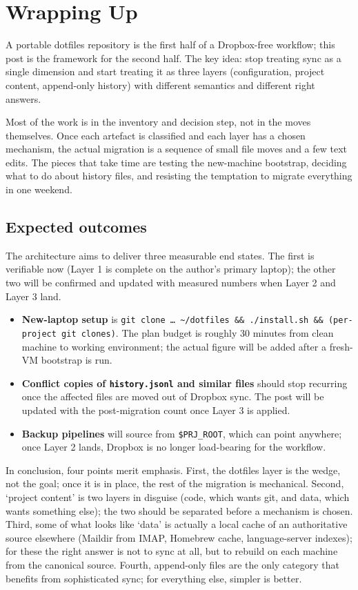 \documentclass[
  11pt,
  letterpaper,
  DIV=11,
  numbers=noendperiod]{scrartcl}
\providecommand{\tightlist}{%
  \setlength{\itemsep}{0pt}\setlength{\parskip}{0pt}}\usepackage{longtable,booktabs,array}
\begin{document}
\section{Wrapping Up}\label{wrapping-up}

A portable dotfiles repository is the first half of a Dropbox-free
workflow; this post is the framework for the second half. The key idea:
stop treating sync as a single dimension and start treating it as three
layers (configuration, project content, append-only history) with
different semantics and different right answers.

Most of the work is in the inventory and decision step, not in the moves
themselves. Once each artefact is classified and each layer has a chosen
mechanism, the actual migration is a sequence of small file moves and a
few text edits. The pieces that take time are testing the new-machine
bootstrap, deciding what to do about history files, and resisting the
temptation to migrate everything in one weekend.

\subsection{Expected outcomes}\label{expected-outcomes}

The architecture aims to deliver three measurable end states. The first
is verifiable now (Layer 1 is complete on the author's primary laptop);
the other two will be confirmed and updated with measured numbers when
Layer 2 and Layer 3 land.

\begin{itemize}
\tightlist
\item
  \textbf{New-laptop setup} is
  \texttt{git\ clone\ …\ \textasciitilde{}/dotfiles\ \&\&\ ./install.sh\ \&\&\ (per-project\ git\ clones)}.
  The plan budget is roughly 30 minutes from clean machine to working
  environment; the actual figure will be added after a fresh-VM
  bootstrap is run.
\item
  \textbf{Conflict copies of \texttt{history.jsonl} and similar files}
  should stop recurring once the affected files are moved out of Dropbox
  sync. The post will be updated with the post-migration count once
  Layer 3 is applied.
\item
  \textbf{Backup pipelines} will source from \texttt{\$PRJ\_ROOT}, which
  can point anywhere; once Layer 2 lands, Dropbox is no longer
  load-bearing for the workflow.
\end{itemize}

In conclusion, four points merit emphasis. First, the dotfiles layer is
the wedge, not the goal; once it is in place, the rest of the migration
is mechanical. Second, `project content' is two layers in disguise
(code, which wants git, and data, which wants something else); the two
should be separated before a mechanism is chosen. Third, some of what
looks like `data' is actually a local cache of an authoritative source
elsewhere (Maildir from IMAP, Homebrew cache, language-server indexes);
for these the right answer is not to sync at all, but to rebuild on each
machine from the canonical source. Fourth, append-only files are the
only category that benefits from sophisticated sync; for everything
else, simpler is better.
\end{document}
